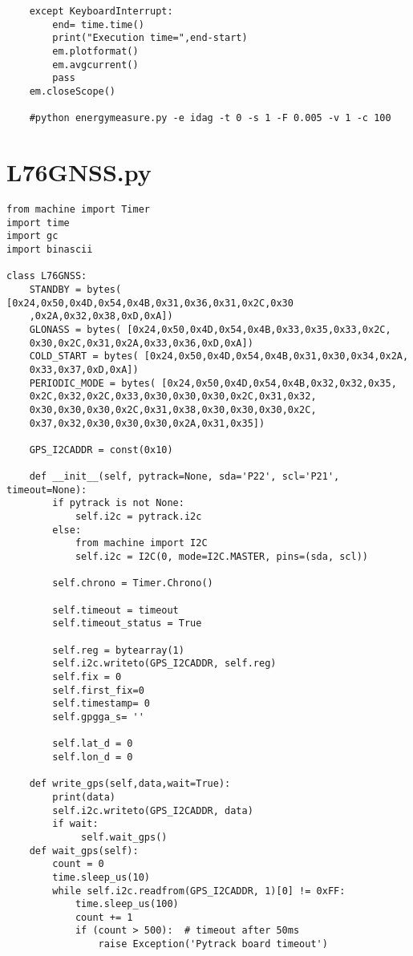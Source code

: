 \begin{appendices}
\begin{lstlisting}
	except KeyboardInterrupt:
		end= time.time()
		print("Execution time=",end-start)
		em.plotformat()
		em.avgcurrent()
		pass
	em.closeScope()

	#python energymeasure.py -e idag -t 0 -s 1 -F 0.005 -v 1 -c 100
\end{lstlisting}
\label{Appendix:EnergyMeasure.py}
\chapter{L76GNSS.py}
\begin{lstlisting}
from machine import Timer
import time
import gc
import binascii

class L76GNSS:
    STANDBY = bytes( [0x24,0x50,0x4D,0x54,0x4B,0x31,0x36,0x31,0x2C,0x30
    ,0x2A,0x32,0x38,0xD,0xA])
    GLONASS = bytes( [0x24,0x50,0x4D,0x54,0x4B,0x33,0x35,0x33,0x2C,
    0x30,0x2C,0x31,0x2A,0x33,0x36,0xD,0xA]) 
    COLD_START = bytes( [0x24,0x50,0x4D,0x54,0x4B,0x31,0x30,0x34,0x2A,
    0x33,0x37,0xD,0xA])
    PERIODIC_MODE = bytes( [0x24,0x50,0x4D,0x54,0x4B,0x32,0x32,0x35,
    0x2C,0x32,0x2C,0x33,0x30,0x30,0x30,0x2C,0x31,0x32,
    0x30,0x30,0x30,0x2C,0x31,0x38,0x30,0x30,0x30,0x2C,
    0x37,0x32,0x30,0x30,0x30,0x2A,0x31,0x35])

    GPS_I2CADDR = const(0x10)

    def __init__(self, pytrack=None, sda='P22', scl='P21', timeout=None):
        if pytrack is not None:
            self.i2c = pytrack.i2c
        else:
            from machine import I2C
            self.i2c = I2C(0, mode=I2C.MASTER, pins=(sda, scl))

        self.chrono = Timer.Chrono()

        self.timeout = timeout
        self.timeout_status = True

        self.reg = bytearray(1)
        self.i2c.writeto(GPS_I2CADDR, self.reg)
        self.fix = 0
        self.first_fix=0
        self.timestamp= 0
        self.gpgga_s= ''

        self.lat_d = 0
        self.lon_d = 0

    def write_gps(self,data,wait=True):
        print(data)
        self.i2c.writeto(GPS_I2CADDR, data)
        if wait:
             self.wait_gps()    
    def wait_gps(self):
        count = 0
        time.sleep_us(10)
        while self.i2c.readfrom(GPS_I2CADDR, 1)[0] != 0xFF:
            time.sleep_us(100)
            count += 1
            if (count > 500):  # timeout after 50ms
                raise Exception('Pytrack board timeout')



\end{lstlisting}
\end{appendices}
